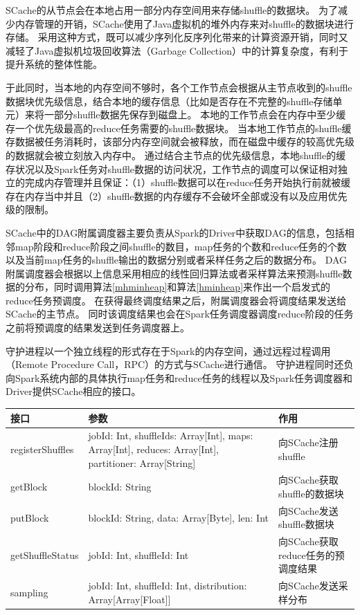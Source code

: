 SCache的从节点会在本地占用一部分内存空间用来存储shuffle的数据块。
为了减少内存管理的开销，SCache使用了Java虚拟机的堆外内存来对shuffle的数据块进行存储。
采用这种方式，既可以减少序列化反序列化带来的计算资源开销，同时又减轻了Java虚拟机垃圾回收算法（Garbage Collection）中的计算复杂度，有利于提升系统的整体性能。

于此同时，当本地的内存空间不够时，各个工作节点会根据从主节点收到的shuffle数据块优先级信息，结合本地的缓存信息（比如是否存在不完整的shuffle存储单元）来将一部分shuffle数据先保存到磁盘上。
本地的工作节点会在内存中至少缓存一个优先级最高的reduce任务需要的shuffle数据块。
当本地工作节点的shuffle缓存数据被任务消耗时，该部分内存空间就会被释放，而在磁盘中缓存的较高优先级的数据就会被立刻放入内存中。
通过结合主节点的优先级信息，本地shuffle的缓存状况以及Spark任务对shuffle数据的访问状况，工作节点的调度可以保证相对独立的完成内存管理并且保证：（1）shuffle数据可以在reduce任务开始执行前就被缓存在内存当中并且（2）shuffle数据的内存缓存不会破坏全部或没有以及应用优先级的限制。

SCache中的DAG附属调度器主要负责从Spark的Driver中获取DAG的信息，包括相邻map阶段和reduce阶段之间shuffle的数目，map任务的个数和reduce任务的个数以及当前map任务的shuffle输出的数据分别或者采样任务之后的数据分布。
DAG附属调度器会根据以上信息采用相应的线性回归算法或者采样算法来预测shuffle数据的分布，同时调用算法\ref{mhminheap}和算法\ref{hminheap}来作出一个启发式的reduce任务预调度。
在获得最终调度结果之后，附属调度器会将调度结果发送给SCache的主节点。
同时该调度结果也会在Spark任务调度器调度reduce阶段的任务之前将预调度的结果发送到任务调度器上。

守护进程以一个独立线程的形式存在于Spark的内存空间，通过远程过程调用（Remote Procedure Call，RPC）的方式与SCache进行通信。
守护进程同时还负向Spark系统内部的具体执行map任务和reduce任务的线程以及Spark任务调度器和Driver提供SCache相应的接口。

\begin{table}[!hpb]
    \centering
    \begin{tabular}{ | m{2.5cm} | m{8cm} | m{5cm} | }
        \hline
        接口 & 参数 & 作用 \\ [0.5ex]
        \hline
        \hline
        registerShuffles & jobId: Int, shuffleIds: Array[Int], maps: Array[Int], reduces: Array[Int], partitioner: Array[String] & 向SCache注册shuffle \\ \hline
        getBlock & blockId: String & 向SCache获取shuffle的数据块 \\ \hline
        putBlock & blockId: String, data: Array[Byte], len: Int & 向SCache发送shuffle数据块 \\ \hline
        getShuffleStatus & jobId: Int, shuffleId: Int & 向SCache获取reduce任务的预调度结果 \\ \hline
        sampling & jobId: Int, shuffleId: Int, distribution: Array[Array[Float]] & 向SCache发送采样分布 \\ 
        \hline
    \end{tabular}
\end{table}

